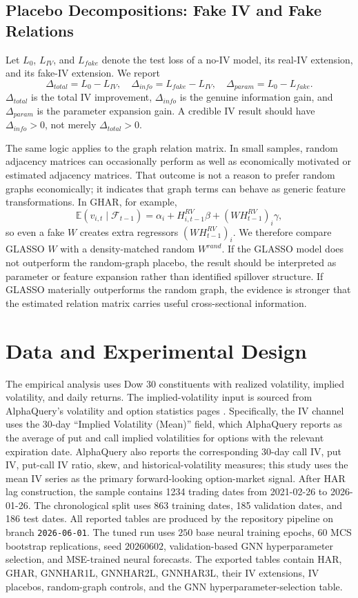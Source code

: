 \documentclass[11pt,a4paper]{article}
\begin{document}
\subsection{Placebo Decompositions: Fake IV and Fake Relations}

Let \(L_0\), \(L_{IV}\), and \(L_{fake}\) denote the test loss of a no-IV model, its real-IV
extension, and its fake-IV extension. We report
\[
\Delta_{total}=L_0-L_{IV},
\quad
\Delta_{info}=L_{fake}-L_{IV},
\quad
\Delta_{param}=L_0-L_{fake}.
\]
\(\Delta_{total}\) is the total IV improvement, \(\Delta_{info}\) is the genuine information gain,
and \(\Delta_{param}\) is the parameter expansion gain. A credible IV result should have
\(\Delta_{info}>0\), not merely \(\Delta_{total}>0\).

The same logic applies to the graph relation matrix. In small samples, random adjacency
matrices can occasionally perform as well as economically motivated or estimated adjacency
matrices. That outcome is not a reason to prefer random graphs economically; it indicates that
graph terms can behave as generic feature transformations. In GHAR, for example,
\[
\mathbb{E}(v_{i,t}\mid \mathcal{F}_{t-1})
= \alpha_i + H^{RV}_{i,t-1}\beta + (WH^{RV}_{t-1})_i\gamma,
\]
so even a fake \(W\) creates extra regressors \((WH^{RV}_{t-1})_i\). We therefore compare
GLASSO \(W\) with a density-matched random \(W^{rand}\). If the GLASSO model does not
outperform the random-graph placebo, the result should be interpreted as parameter or feature
expansion rather than identified spillover structure. If GLASSO materially outperforms the
random graph, the evidence is stronger that the estimated relation matrix carries useful
cross-sectional information.

\section{Data and Experimental Design}

The empirical analysis uses Dow 30 constituents with realized volatility, implied volatility, and
daily returns. The implied-volatility input is sourced from AlphaQuery's volatility and option
statistics pages \citep{alphaquery2026}. Specifically, the IV channel uses the 30-day
``Implied Volatility (Mean)'' field, which AlphaQuery reports as the average of put and call
implied volatilities for options with the relevant expiration date. AlphaQuery also reports
the corresponding 30-day call IV, put IV, put-call IV ratio, skew, and historical-volatility
measures; this study uses the mean IV series as the primary forward-looking option-market
signal. After HAR lag construction, the sample contains 1234 trading dates from 2021-02-26 to
2026-01-26. The chronological split uses 863 training dates, 185 validation dates, and 186 test
dates. All reported tables are produced by the repository pipeline on branch
\texttt{2026-06-01}. The tuned run uses \(250\) base neural training epochs,
\(60\) MCS bootstrap replications, seed \(20260602\), validation-based GNN hyperparameter
selection, and MSE-trained neural forecasts. The exported tables contain HAR, GHAR,
GNNHAR1L, GNNHAR2L, GNNHAR3L, their IV extensions, IV placebos, random-graph controls,
and the GNN hyperparameter-selection table.
\end{document}
